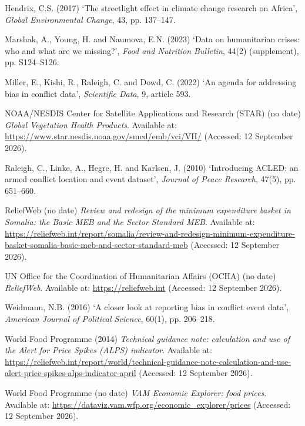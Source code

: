 \documentclass[12pt,a4paper]{article}
\begin{document}
\begin{list}{}{\setlength{\leftmargin}{1cm}\setlength{\itemindent}{-1cm}\setlength{\itemsep}{8pt}}
\item Hendrix, C.S. (2017) `The streetlight effect in climate change research on Africa', \textit{Global Environmental Change}, 43, pp. 137--147.

\item Marshak, A., Young, H. and Naumova, E.N. (2023) `Data on humanitarian crises: who and what are we missing?', \textit{Food and Nutrition Bulletin}, 44(2) (supplement), pp. S124--S126.

\item Miller, E., Kishi, R., Raleigh, C. and Dowd, C. (2022) `An agenda for addressing bias in conflict data', \textit{Scientific Data}, 9, article 593.

\item NOAA/NESDIS Center for Satellite Applications and Research (STAR) (no date) \textit{Global Vegetation Health Products}. Available at: \url{https://www.star.nesdis.noaa.gov/smcd/emb/vci/VH/} (Accessed: 12 September 2026).

\item Raleigh, C., Linke, A., Hegre, H. and Karlsen, J. (2010) `Introducing ACLED: an armed conflict location and event dataset', \textit{Journal of Peace Research}, 47(5), pp. 651--660.

\item ReliefWeb (no date) \textit{Review and redesign of the minimum expenditure basket in Somalia: the Basic MEB and the Sector Standard MEB}. Available at: \url{https://reliefweb.int/report/somalia/review-and-redesign-minimum-expenditure-basket-somalia-basic-meb-and-sector-standard-meb} (Accessed: 12 September 2026).

\item UN Office for the Coordination of Humanitarian Affairs (OCHA) (no date) \textit{ReliefWeb}. Available at: \url{https://reliefweb.int} (Accessed: 12 September 2026).

\item Weidmann, N.B. (2016) `A closer look at reporting bias in conflict event data', \textit{American Journal of Political Science}, 60(1), pp. 206--218.

\item World Food Programme (2014) \textit{Technical guidance note: calculation and use of the Alert for Price Spikes (ALPS) indicator}. Available at: \url{https://reliefweb.int/report/world/technical-guidance-note-calculation-and-use-alert-price-spikes-alps-indicator-april} (Accessed: 12 September 2026).

\item World Food Programme (no date) \textit{VAM Economic Explorer: food prices}. Available at: \url{https://dataviz.vam.wfp.org/economic_explorer/prices} (Accessed: 12 September 2026).

\end{list}
\endgroup
\end{document}
